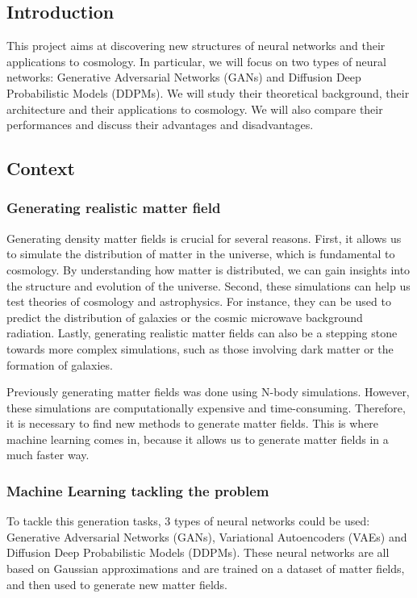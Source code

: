 \documentclass[11pt,a4paper]{report}
\begin{document}
\begin{multicols*}{2}

    \chapter{Introduction}
    This project aims at discovering new structures of neural networks and their applications to cosmology. In particular, we will focus on two types of neural networks: Generative Adversarial Networks (GANs) and Diffusion Deep Probabilistic Models (DDPMs). We will study their theoretical background, their architecture and their applications to cosmology.
    We will also compare their performances and discuss their advantages and disadvantages.
    \section{Context}

    \subsection{Generating realistic matter field}
    Generating density matter fields is crucial for several reasons. First, it allows us to simulate the distribution of matter in the universe, which is fundamental to cosmology. By understanding how matter is distributed, we can gain insights into the structure and evolution of the universe. Second, these simulations can help us test theories of cosmology and astrophysics.
    For instance, they can be used to predict the distribution of galaxies or the cosmic microwave background radiation.
    Lastly, generating realistic matter fields can also be a stepping stone towards more complex simulations, such as those involving dark matter or the formation of galaxies.

    Previously generating matter fields was done using N-body simulations. However, these simulations are computationally expensive and time-consuming. Therefore, it is necessary to find new methods to generate matter fields. This is where machine learning comes in, because it allows us to generate matter fields in a much faster  way.

    \subsection{Machine Learning tackling the problem}
    To tackle this generation tasks, 3 types of neural networks could be used: Generative Adversarial Networks (GANs), Variational Autoencoders (VAEs) and Diffusion Deep Probabilistic Models (DDPMs). These neural networks are all based on Gaussian approximations and are trained on a dataset of matter fields, and then used to generate new matter fields.

\end{multicols*}
\end{document}
